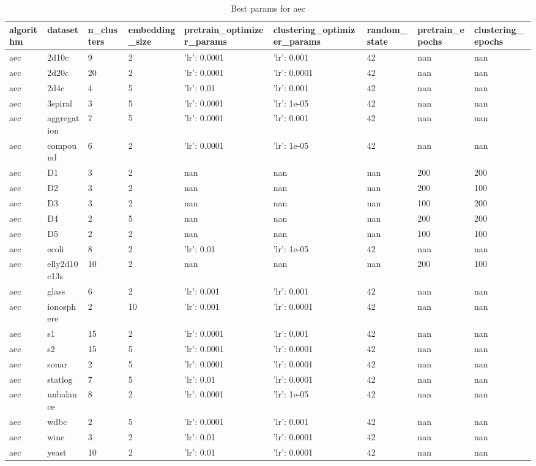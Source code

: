 \begin{table}[H]
\centering
\caption{Best params for aec}
\label{S2_Table}
\begin{tabular}{|l|l|l|l|l|l|l|l|l|}
\hline
algorithm & dataset & n\_clusters & embedding\_size & pretrain\_optimizer\_params & clustering\_optimizer\_params & random\_state & pretrain\_epochs & clustering\_epochs \\
\hline
aec & 2d10c & 9 & 2 & {'lr': 0.0001} & {'lr': 0.001} & 42 & nan & nan \\
\hline
aec & 2d20c & 20 & 2 & {'lr': 0.0001} & {'lr': 0.0001} & 42 & nan & nan \\
\hline
aec & 2d4c & 4 & 5 & {'lr': 0.01} & {'lr': 0.001} & 42 & nan & nan \\
\hline
aec & 3spiral & 3 & 5 & {'lr': 0.0001} & {'lr': 1e-05} & 42 & nan & nan \\
\hline
aec & aggregation & 7 & 5 & {'lr': 0.0001} & {'lr': 0.001} & 42 & nan & nan \\
\hline
aec & compound & 6 & 2 & {'lr': 0.0001} & {'lr': 1e-05} & 42 & nan & nan \\
\hline
aec & D1 & 3 & 2 & nan & nan & nan & 200 & 200 \\
\hline
aec & D2 & 3 & 2 & nan & nan & nan & 200 & 100 \\
\hline
aec & D3 & 3 & 2 & nan & nan & nan & 100 & 200 \\
\hline
aec & D4 & 2 & 5 & nan & nan & nan & 200 & 200 \\
\hline
aec & D5 & 2 & 2 & nan & nan & nan & 100 & 100 \\
\hline
aec & ecoli & 8 & 2 & {'lr': 0.01} & {'lr': 1e-05} & 42 & nan & nan \\
\hline
aec & elly2d10c13s & 10 & 2 & nan & nan & nan & 200 & 100 \\
\hline
aec & glass & 6 & 2 & {'lr': 0.001} & {'lr': 0.001} & 42 & nan & nan \\
\hline
aec & ionosphere & 2 & 10 & {'lr': 0.001} & {'lr': 0.0001} & 42 & nan & nan \\
\hline
aec & s1 & 15 & 2 & {'lr': 0.0001} & {'lr': 0.001} & 42 & nan & nan \\
\hline
aec & s2 & 15 & 5 & {'lr': 0.0001} & {'lr': 0.0001} & 42 & nan & nan \\
\hline
aec & sonar & 2 & 5 & {'lr': 0.0001} & {'lr': 0.0001} & 42 & nan & nan \\
\hline
aec & statlog & 7 & 5 & {'lr': 0.01} & {'lr': 0.0001} & 42 & nan & nan \\
\hline
aec & unbalance & 8 & 2 & {'lr': 0.0001} & {'lr': 1e-05} & 42 & nan & nan \\
\hline
aec & wdbc & 2 & 5 & {'lr': 0.0001} & {'lr': 0.001} & 42 & nan & nan \\
\hline
aec & wine & 3 & 2 & {'lr': 0.01} & {'lr': 0.0001} & 42 & nan & nan \\
\hline
aec & yeast & 10 & 2 & {'lr': 0.01} & {'lr': 0.0001} & 42 & nan & nan \\
\hline
\end{tabular}
\end{table}

